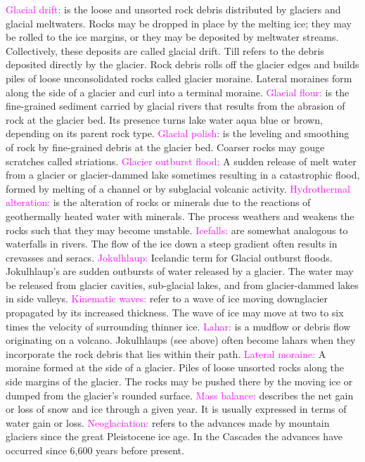 \documentclass{article}
\newcommand{\pink}[1]{\textcolor{magenta}{#1}}
\newcommand{\vocab}[1]{{\pink{#1}}}
\begin{document}
\begin{multicols*}{4}
		\vocab{Glacial drift:} is the loose and unsorted rock debris distributed by glaciers and glacial meltwaters. Rocks may be dropped in place by the melting ice; they may be rolled to the ice margins, or they may be deposited by meltwater streams. Collectively, these deposits are called glacial drift. Till refers to the debris deposited directly by the glacier. Rock debris rolls off the glacier edges and builds piles of loose unconsolidated rocks called glacier moraine. Lateral moraines form along the side of a glacier and curl into a terminal moraine.
		\vocab{Glacial flour:} is the fine-grained sediment carried by glacial rivers that results from the abrasion of rock at the glacier bed. Its presence turns lake water aqua blue or brown, depending on its parent rock type.
		\vocab{Glacial polish:} is the leveling and smoothing of rock by fine-grained debris at the glacier bed. Coarser rocks may gouge scratches called striations.
		\vocab{Glacier outburst flood:} A sudden release of melt water from a glacier or glacier-dammed lake sometimes resulting in a catastrophic flood, formed by melting of a channel or by subglacial volcanic activity.
		\vocab{Hydrothermal alteration:} is the alteration of rocks or minerals due to the reactions of geothermally heated water with minerals. The process weathers and weakens the rocks such that they may become unstable.
		\vocab{Icefalls:} are somewhat analogous to waterfalls in rivers. The flow of the ice down a steep gradient often results in crevasses and seracs.
		\vocab{Jokulhlaup:} Icelandic term for Glacial outburst floods. Jokulhlaup's are sudden outbursts of water released by a glacier. The water may be released from glacier cavities, sub-glacial lakes, and from glacier-dammed lakes in side valleys.
		\vocab{Kinematic waves:} refer to a wave of ice moving downglacier propagated by its increased thickness. The wave of ice may move at two to six times the velocity of surrounding thinner ice.
		\vocab{Lahar:} is a mudflow or debris flow originating on a volcano. Jokulhlaups (see above) often become lahars when they incorporate the rock debris that lies within their path.
		\vocab{Lateral moraine:} A moraine formed at the side of a glacier. Piles of loose unsorted rocks along the side margins of the glacier. The rocks may be pushed there by the moving ice or dumped from the glacier's rounded surface.
		\vocab{Mass balance: }describes the net gain or loss of snow and ice through a given year. It is usually expressed in terms of water gain or loss.
		\vocab{Neoglaciation:} refers to the advances made by mountain glaciers since the great Pleistocene ice age. In the Cascades the advances have occurred since 6,600 years before present.

\end{multicols*}
\end{document}
